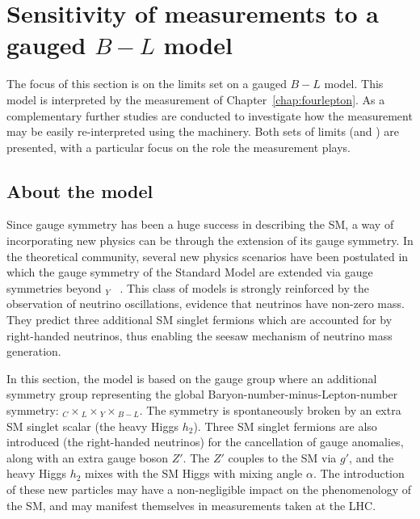 \section{Sensitivity of \LHC measurements to a gauged $B-L$ model}
\label{sec:BL}
The focus of this section is on the limits set on a gauged $B-L$ model. This model is interpreted by the \ATLAS \mFourL{} measurement of Chapter~\ref{chap:fourlepton}. As a complementary further studies are conducted to investigate how the \mFourL{} measurement may be easily re-interpreted using the \contur machinery. Both sets of limits (\ATLAS and \contur) are presented, with a particular focus on the role the \mFourL{} measurement plays. 

\subsection{About the model}
Since gauge symmetry has been a huge success in describing the SM, a way of incorporating new physics can be through the extension of its gauge symmetry. In the theoretical community, several new physics scenarios have been postulated in which the gauge symmetry of the Standard Model are extended via  gauge symmetries beyond $_Y$ \cite{}~. This class of models is strongly reinforced by the observation of neutrino oscillations, evidence that neutrinos have non-zero mass. They predict three additional SM singlet fermions which are accounted for by right-handed neutrinos, thus enabling the seesaw mechanism of neutrino mass generation. 

In this section, the model is based on the gauge group where an additional \BLgroup{} symmetry group representing the global Baryon-number-minus-Lepton-number symmetry: $_C\times$$_L\times$$_Y\times$$_{B-L}$. The symmetry is spontaneously broken by an extra SM singlet scalar (the heavy Higgs $h_2$). Three SM singlet fermions are also introduced (the right-handed neutrinos) for the cancellation of gauge anomalies, along with an extra gauge boson $Z'$. The $Z'$ couples to the SM via $g'$, and the heavy Higgs $h_2$ mixes with the SM Higgs with mixing angle $\alpha$. The introduction of these new particles may have a non-negligible impact on the phenomenology of the SM, and may manifest themselves in measurements taken at the LHC. 

